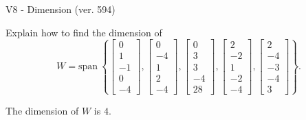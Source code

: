 \begin{exercise}
  \begin{exerciseTitle}V8 - Dimension (ver. 594)\end{exerciseTitle}
  \begin{exerciseStatement}
    Explain how to find the dimension of 
\[W=\mathrm{span}\ \left\{\left[\begin{array}{r}
0 \\
1 \\
-1 \\
0 \\
-4
\end{array}\right] , \left[\begin{array}{r}
0 \\
-4 \\
1 \\
2 \\
-4
\end{array}\right] , \left[\begin{array}{r}
0 \\
3 \\
3 \\
-4 \\
28
\end{array}\right] , \left[\begin{array}{r}
2 \\
-2 \\
1 \\
-2 \\
-4
\end{array}\right] , \left[\begin{array}{r}
2 \\
-4 \\
-3 \\
-4 \\
3
\end{array}\right]\right\}.\]



  \end{exerciseStatement}
  \begin{exerciseAnswer}
   The dimension of \(W\) is  \(4\).
  


  \end{exerciseAnswer}
\end{exercise}